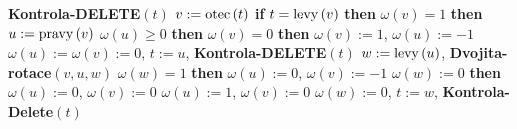 {\bf Kontrola-DELETE$\left(t\right)$\newline 
$v:=\operatorname{otec}\left(t\right)$\newline 
if} $t=\operatorname{levy}\left(v\right)$ {\bf then}\newline 
\phantom{---}{\bf if} $\omega \left(v\right)=1$ {\bf then}\newline 
\phantom{------}$u:=\operatorname{pravy}\left(v\right)$\newline 
\phantom{------}{\bf if} $\omega \left(u\right)\ge 0$ {\bf then}\newline 
\phantom{---------}{\bf Rotace$\left(v,u\right)$}\newline 
\phantom{---------}{\bf if} $\omega \left(v\right)=0$ {\bf then}\newline 
\phantom{------------}$\omega \left(v\right):=1$, $\omega \left(u\right):=-1$\newline 
\phantom{---------}{\bf else}\newline 
\phantom{------------}$\omega \left(u\right):=\omega \left(v\right):=0$, $t:=u$, {\bf Kontrola-DELETE}$\left(t\right)$\newline 
\phantom{---------}{\bf endif}\newline 
\phantom{------}{\bf else}\newline 
\phantom{---------}$w:=\operatorname{levy}\left(u\right)$, {\bf Dvojita-rotace}$\left(v,u,w\right)$\newline 
\phantom{---------}{\bf if} $\omega \left(w\right)=1$ {\bf then}\newline 
\phantom{------------}$\omega \left(u\right):=0$, $\omega \left(v\right):=-1$\newline 
\phantom{---------}{\bf else}\newline 
\phantom{------------}{\bf if} $\omega \left(w\right):=0$ {\bf then}\newline 
\phantom{---------------}$\omega \left(u\right):=0$, $\omega\left(v\right):=0$\newline 
\phantom{------------}{\bf else}\newline 
\phantom{---------------}$\omega \left(u\right):=1$, $\omega \left(v\right):=0$\newline 
\phantom{------------}{\bf endif}\newline 
\phantom{---------}{\bf endif}\newline 
\phantom{---------}$\omega \left(w\right):=0$, $t:=w$, {\bf Kontrola-Delete}$\left(t\right)$\newline 
\phantom{------}{\bf endif}\newline 
\phantom{---}{\bf endif\newline 
else}\newline 
